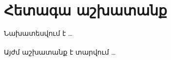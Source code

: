 {
	\clearpage
	\section{Հետագա աշխատանք}\label{sec:furtherWork}
	Նախատեսվում է \ldots \\
	\\
	Այժմ աշխատանք է տարվում \ldots
}